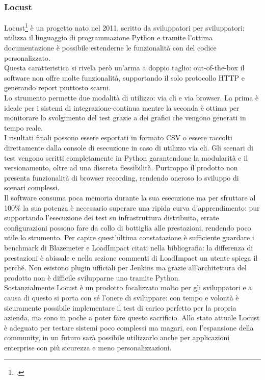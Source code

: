 \subsubsection{Locust}
Locust\footcite{site:locust} è un progetto nato nel 2011, scritto da sviluppatori per sviluppatori: utilizza il linguaggio di programmazione Python e tramite l'ottima documentazione è possibile estenderne le funzionalità con del codice personalizzato. \\
Questa caratteristica si rivela però un'arma a doppio taglio: \gls{out-of-the-box} il software non offre molte funzionalità, supportando il solo protocollo HTTP e generando report piuttosto scarni.\\
Lo strumento permette due modalità di utilizzo: via \gls{cli} e via browser. La prima è ideale per i sistemi di \gls{integrazione-continua} mentre la seconda è ottima per monitorare lo svolgimento del test grazie a dei grafici che vengono generati in tempo reale. \\
I risultati finali possono essere esportati in formato CSV o essere raccolti direttamente dalla console di esecuzione in caso di utilizzo via \gls{cli}.
Gli scenari di test vengono scritti completamente in Python garantendone la modularità e il versionamento, oltre ad una discreta flessibilità. Purtroppo il prodotto non presenta funzionalità di browser recording, rendendo oneroso lo sviluppo di scenari complessi.\\
Il software consuma poca memoria durante la sua esecuzione ma per sfruttare al 100\% la sua potenza è necessario superare una ripida curva d'apprendimento: pur supportando l'esecuzione dei test su infrastruttura distribuita, errate configurazioni possono fare da collo di bottiglia alle prestazioni, rendendo poco utile lo strumento. Per capire quest'ultima constatazione è sufficiente guardare i benchmark di Blazemeter e LoadImpact citati nella bibliografia: la differenza di prestazioni è abissale e nella sezione commenti di LoadImpact un utente spiega il perché. 
Non esistono \gls{plugin} ufficiali per Jenkins ma grazie all'architettura del prodotto non è difficile svilupparne uno tramite Python. \\
Sostanzialmente Locust è un prodotto focalizzato molto per gli sviluppatori e a causa di questo si porta con sé l'onere di sviluppare: con tempo e volontà è sicuramente possibile implementare il test di carico perfetto per la propria azienda, ma sono in poche a poter fare questo sacrificio.
Allo stato attuale Locust è adeguato per testare sistemi poco complessi ma magari, con l'espansione della community, in un futuro sarà possibile utilizzarlo anche per applicazioni enterprise con più sicurezza e meno personalizzazioni.
